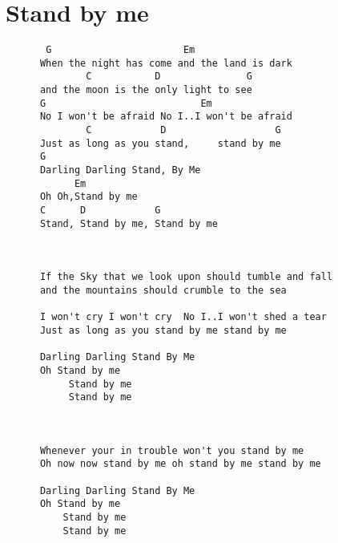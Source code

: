 \documentclass[leqno]{memoir}
\begin{document}
\chapter{Stand by me}
\begin{verbatim}
       G                       Em
      When the night has come and the land is dark
              C           D               G
      and the moon is the only light to see
      G                           Em
      No I won't be afraid No I..I won't be afraid
              C            D                   G
      Just as long as you stand,     stand by me
      G                   
      Darling Darling Stand, By Me
            Em
      Oh Oh,Stand by me
      C      D            G
      Stand, Stand by me, Stand by me



      If the Sky that we look upon should tumble and fall
      and the mountains should crumble to the sea

      I won't cry I won't cry  No I..I won't shed a tear
      Just as long as you stand by me stand by me

      Darling Darling Stand By Me
      Oh Stand by me
           Stand by me
           Stand by me



      Whenever your in trouble won't you stand by me
      Oh now now stand by me oh stand by me stand by me

      Darling Darling Stand By Me
      Oh Stand by me
          Stand by me
          Stand by me

\end{verbatim}
\newpage
\end{document}
